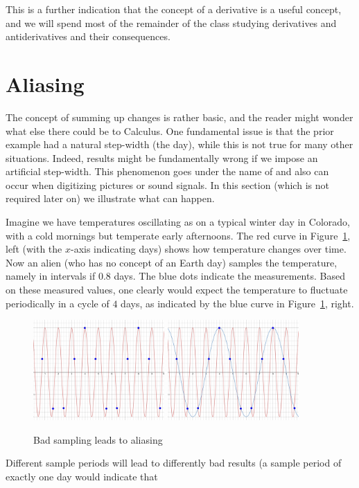 This is a further indication that the concept of a derivative is a useful
concept, and we will spend most of the remainder of the class studying
derivatives and antiderivatives and their consequences.

\section{Aliasing}

The concept of summing up changes is rather basic, and the reader might
wonder what else there could be to Calculus. One fundamental issue is that
the prior example had a natural step-width (the day), while this is not true
for many other situations. Indeed, results might be fundamentally wrong if
we impose an artificial step-width. This phenomenon goes under the name of
 and also can occur when digitizing pictures or sound
signals. In this section (which is not required later on) we illustrate what
can happen.
\smallskip

Imagine we  have temperatures oscillating as on a typical winter day in
Colorado, with a cold mornings but temperate early afternoons. The red curve
in Figure~\ref{figalias}, left (with the $x$-axis indicating days) shows
how temperature changes over time. Now an alien (who has no concept of an
Earth day) samples the temperature, namely in intervals if $0.8$ days. The
blue dots indicate the measurements. Based on these measured values, one
clearly would expect the temperature to fluctuate periodically in a cycle of
$4$ days, as indicated by the blue curve in Figure~\ref{figalias}, right.
\begin{figure}
\begin{center}
\includegraphics[width=5cm]{pic/Aliasing1.pdf}
\quad
\includegraphics[width=5cm]{pic/Aliasing2.pdf}
\end{center}
\caption{Bad sampling leads to aliasing}
\label{figalias}
\end{figure}
Different sample periods will lead to differently bad results (a sample
period of exactly one day would indicate that 

